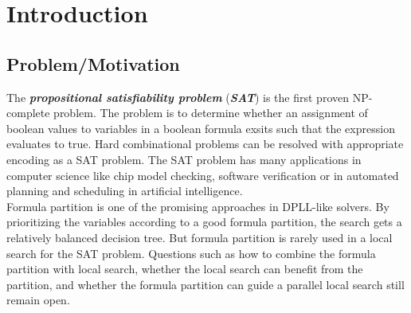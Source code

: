 \documentclass[12pt,a4paper,twoside]{scrartcl}
\numberwithin{equation}{section}
\begin{document}
\vfill\vfill\vfill
\clearpage


\pagestyle{plain}
  
\renewcommand\sectionmark[1]{\markboth{\thesection\quad\MakeUppercase{#1}}{\thesection\quad\MakeUppercase{#1}}}
\renewcommand\subsectionmark[1]{\markright{\thesubsection\quad\MakeUppercase{#1}}}


\tableofcontents
\afterpage{\null\newpage}
\clearpage

\pagestyle{normal}

\section{Introduction} 
\label{sec:Intro}
\subsection{Problem/Motivation} 
The \emph{\textbf{propositional satisfiability problem}} (\emph{\textbf{SAT}}) is the first proven NP-complete problem\cite{cook1971complexity}. The problem is to determine whether an assignment of boolean values to variables in a boolean formula exsits such that the expression evaluates to true. Hard combinational problems can be resolved with appropriate encoding as a SAT problem.
The SAT problem has many applications in computer science like chip model checking\cite{clarke2001bounded}, software verification\cite{ivanvcic2008efficient} or in automated planning and scheduling in artificial intelligence\cite{kautz1999unifying}. \\
Formula partition is one of the promising approaches in DPLL-like solvers\cite{mann2017guiding}. By prioritizing the variables according to a good formula partition, the search gets a relatively balanced decision tree. But formula partition is rarely used in a local search for the SAT problem. Questions such as how to combine the formula partition with local search, whether the local search can benefit from the partition, and whether the formula partition can guide a parallel local search still remain open. 
\end{document}
